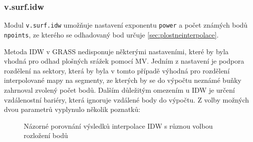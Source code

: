 \documentclass[a4paper,12pt,oneside]{report}
\begin{document}
\subsubsection*{v.surf.idw}
Modul \texttt{v.surf.idw} umožňuje nastavení exponentu \texttt{power}
a počet známých bodů \texttt{npoints}, ze kterého se odhadovaný bod
určuje \ref{sec:plostneinterpolace}.


Metoda \ac{IDW} v GRASS nedisponuje některými nastaveními, které by byla vhodná
pro odhad plošných srážek pomocí MV. Jedním z nastavení je
podpora rozdělení na sektory, která by byla v tomto případě výhodná
pro rozdělení interpolované mapy na segmenty, ze kterých by se do
výpočtu neznámé buňky zahrnoval zvolený počet bodů. Dalším důležitým
omezením u IDW je určení vzdálenostní bariéry, která ignoruje vzdálené
body do výpočtu. Z volby možných dvou parametrů vyplynulo několik
poznatků:
\begin{figure}[h!]%
    \centering
    \qquad
       \caption[Interpolace IDW]{Názorné porovnání výsledků interpolace IDW s různou volbou rozložení bodů \centering}%

    \label{fig:example}%
\end{figure}
\end{document}
